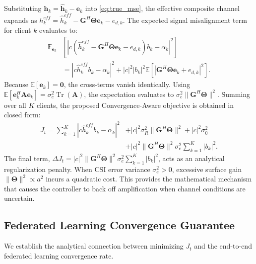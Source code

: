\documentclass[journal,twocolumn]{IEEEtran}
\begin{document}
Substituting $\mathbf{h}_k = \hat{\mathbf{h}}_k - \mathbf{e}_k$ into \eqref{eq:true_mse}, the effective composite channel expands as $h_k^{eff} = \hat{h}_k^{eff} - \mathbf{G}^H \mathbf{\Theta} \mathbf{e}_k - e_{d,k}$.
The expected signal misalignment term for client $k$ evaluates to:
\begin{align}
    \mathbb{E}_{\mathbf{e}_k} & \left[|c (\hat{h}_k^{eff} - \mathbf{G}^H \mathbf{\Theta} \mathbf{e}_k - e_{d,k}) b_k - \alpha_k|^2\right] \nonumber \\
    &= |c \hat{h}_k^{eff} b_k - \alpha_k|^2 + |c|^2 |b_k|^2 \mathbb{E}\left[|\mathbf{G}^H \mathbf{\Theta} \mathbf{e}_k + e_{d,k}|^2\right].
\end{align}
Because $\mathbb{E}[\mathbf{e}_k] = \mathbf{0}$, the cross-terms vanish identically. Using $\mathbb{E}[\mathbf{e}_k^H \mathbf{A} \mathbf{e}_k] = \sigma_e^2 \operatorname{Tr}(\mathbf{A})$, the expectation evaluates to $\sigma_e^2 \|\mathbf{G}^H \mathbf{\Theta}\|^2$. Summing over all $K$ clients, the proposed Convergence-Aware objective is obtained in closed form:
\begin{align}
    J_t = \sum_{k=1}^K |c \hat{h}_k^{eff} b_k - \alpha_k|^2 &+ |c|^2 \sigma_R^2 \|\mathbf{G}^H \mathbf{\Theta}\|^2 + |c|^2 \sigma_0^2 \nonumber \\
    &+ |c|^2 \|\mathbf{G}^H \mathbf{\Theta}\|^2 \sigma_e^2 \sum_{k=1}^K |b_k|^2.
    \label{eq:conv_aware_closed_form}
\end{align}
The final term, $\Delta J_t = |c|^2 \|\mathbf{G}^H \mathbf{\Theta}\|^2 \sigma_e^2 \sum_{k=1}^K |b_k|^2$, acts as an analytical regularization penalty. When CSI error variance $\sigma_e^2 > 0$, excessive surface gain $\|\mathbf{\Theta}\|^2 \propto a^2$ incurs a quadratic cost. This provides the mathematical mechanism that causes the controller to back off amplification when channel conditions are uncertain.

\subsection{Federated Learning Convergence Guarantee}
We establish the analytical connection between minimizing $J_t$ and the end-to-end federated learning convergence rate.
\end{document}
